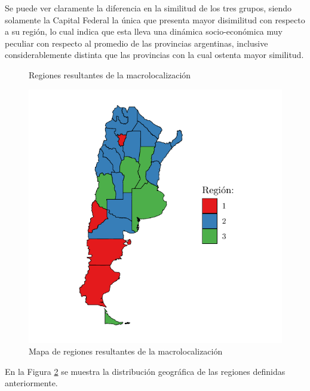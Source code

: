 \documentclass[12pt,a4paper]{article}
\begin{document}
Se puede ver claramente la diferencia en la similitud de los tres grupos, siendo solamente la Capital Federal la única que presenta mayor disimilitud con respecto a su región, lo cual indica que esta  lleva una dinámica socio-económica muy peculiar con respecto al promedio de las provincias argentinas, inclusive considerablemente distinta que las provincias con la cual ostenta mayor similitud.
\begin{figure}[ht!]
\begin{center}

\caption{Regiones resultantes de la macrolocalización}
\label{figure:reg_resultantes}
\end{center}
\end{figure}
\begin{figure}[ht!]
\begin{center}
\includegraphics[scale=0.7]{./graficos/mapa_regiones.pdf}
\caption{Mapa de regiones resultantes de la macrolocalización}
\label{figure:mapa_reg}
\end{center}
\end{figure}
\newpage
En la Figura \ref{figure:mapa_reg} se muestra la distribución geográfica de las regiones definidas anteriormente.
\end{document}

